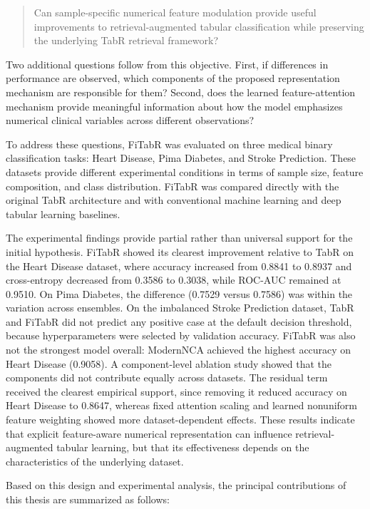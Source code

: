 \documentclass[11pt,a4paper,oneside, openany, reqno, chapter, nokorean]{oblivoir}
\theoremstyle{definition}
\theoremstyle{remark}
\numberwithin{equation}{chapter}
\theoremstyle{definition}
\theoremstyle{remark}
\theoremstyle{definition}
\begin{document}
\begin{quote}
Can sample-specific numerical feature modulation provide useful improvements
to retrieval-augmented tabular classification while preserving the underlying
TabR retrieval framework?
\end{quote}
Two additional questions follow from this objective. First, if differences in
performance are observed, which components of the proposed representation
mechanism are responsible for them? Second, does the learned feature-attention
mechanism provide meaningful information about how the model emphasizes
numerical clinical variables across different observations?

To address these questions, FiTabR was evaluated on three medical binary
classification tasks: Heart Disease, Pima Diabetes, and Stroke Prediction.
These datasets provide different experimental conditions in terms of sample
size, feature composition, and class distribution. FiTabR was compared directly
with the original TabR architecture and with conventional machine learning and
deep tabular learning baselines.

The experimental findings provide partial rather than universal support for
the initial hypothesis. FiTabR showed its clearest improvement relative to TabR
on the Heart Disease dataset, where accuracy increased from 0.8841 to 0.8937
and cross-entropy decreased from 0.3586 to 0.3038, while ROC-AUC remained at
0.9510. On Pima Diabetes, the difference (0.7529 versus 0.7586) was within the
variation across ensembles. On the imbalanced Stroke Prediction
dataset, TabR and FiTabR did not predict any positive case at the default
decision threshold, because hyperparameters were selected by validation
accuracy. FiTabR was also not the strongest model overall: ModernNCA achieved
the highest accuracy on Heart Disease (0.9058). A component-level ablation
study showed that the components did not contribute equally across datasets.
The residual term received the clearest empirical support, since
removing it reduced accuracy on Heart Disease to 0.8647, whereas fixed
attention scaling and learned nonuniform feature weighting showed more
dataset-dependent effects. These results indicate that explicit feature-aware
numerical representation can influence retrieval-augmented tabular learning,
but that its effectiveness depends on the characteristics of the underlying
dataset.

Based on this design and experimental analysis, the principal contributions of
this thesis are summarized as follows:
\end{document}
